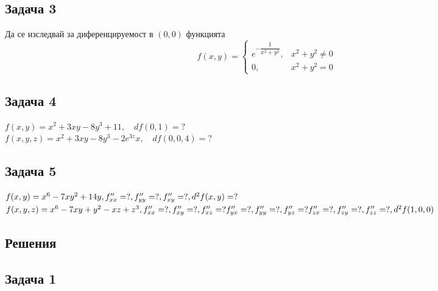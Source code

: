 \documentclass[a4paper,fleqn,12pt]{article}
\theoremstyle{definition}
\begin{document}
\subsection*{Задача 3}
Да се изследвай за диференцируемост в $(0,0)$ функцията 
$$f(x,y) = 
\begin{cases}
e^{- \dfrac{1}{x^2 + y^2}}, & x^2 + y^2 \neq 0 \\
0, & x^2 + y^2 = 0
\end{cases}
$$

\subsection*{Задача 4}
$f(x,y) = x^2 + 3xy - 8y^3 + 11, \quad df(0,1) =?$\\
$f(x,y,z) = x^2 + 3xy - 8y^3 - 2e^{3z}x, \quad df(0,0,4) = ? $

\subsection*{Задача 5}
$f(x,y) = x^6 - 7xy^2 + 14y,\\
f''_{xx} = ?, f''_{yy} = ?, f''_{xy} = ?, d^2f(x,y) = ?$\\
$f(x,y,z) = x^6 - 7xy +y^2 - xz + z^3 ,  \\
f''_{xx} = ?, f''_{xy} = ?, f''_{xz} = ?  f''_{yx} = ?, f''_{yy} = ?, f''_{yz} = ?  f''_{zx} = ?, f''_{zy} = ?, f''_{zz} = ?, d^2f(1,0,0)$

\newpage
\subsection{Решения} 

\subsection*{Задача 1}
\end{document}
